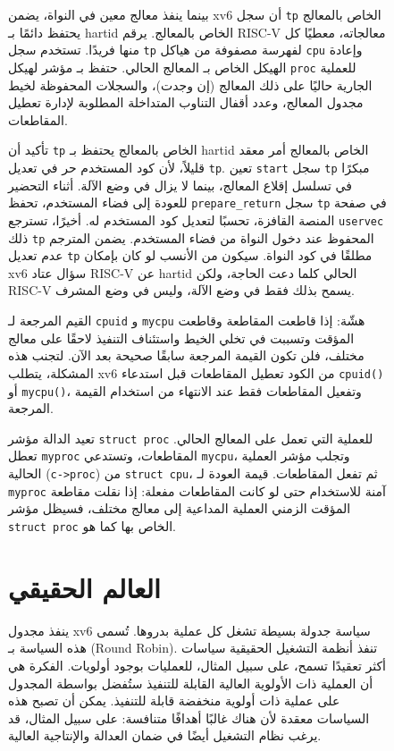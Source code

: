 \begin{figure}[t]
بينما ينفذ معالج معين في النواة، يضمن xv6 أن سجل \lstinline{tp} الخاص بالمعالج يحتفظ دائمًا بـ hartid الخاص بالمعالج.
يرقم RISC-V معالجاته، معطيًا كل منها  فريدًا.
تستخدم   سجل \lstinline{tp} لفهرسة مصفوفة من هياكل \lstinline{cpu} وإعادة الهيكل الخاص بـ المعالج الحالي.
حتفظ  بـ مؤشر لهيكل \lstinline{proc} للعملية الجارية حاليًا على ذلك المعالج (إن وجدت)،
والسجلات المحفوظة لخيط مجدول المعالج، وعدد أقفال التناوب المتداخلة المطلوبة لإدارة تعطيل المقاطعات.

تأكيد أن \lstinline{tp} الخاص بالمعالج يحتفظ بـ hartid الخاص بالمعالج أمر معقد قليلاً، لأن كود المستخدم حر في تعديل \lstinline{tp}.
تعين \lstinline{start} سجل \lstinline{tp} مبكرًا في تسلسل إقلاع المعالج، بينما لا يزال في وضع الآلة.
أثناء التحضير للعودة إلى فضاء المستخدم، تحفظ \lstinline{prepare_return} سجل \lstinline{tp} في صفحة المنصة القافزة، تحسبًا لتعديل كود المستخدم له.
أخيرًا، تسترجع \lstinline{uservec} ذلك \lstinline{tp} المحفوظ عند دخول النواة من فضاء المستخدم.
يضمن المترجم عدم تعديل \lstinline{tp} مطلقًا في كود النواة.
سيكون من الأنسب لو كان بإمكان xv6 سؤال عتاد RISC-V عن hartid الحالي كلما دعت الحاجة، ولكن RISC-V يسمح بذلك فقط في وضع الآلة، وليس في وضع المشرف.

القيم المرجعة لـ \lstinline{cpuid} و \lstinline{mycpu} هشّة: إذا قاطعت المقاطعة وقاطعت المؤقت وتسببت في تخلي الخيط واستئناف التنفيذ لاحقًا على معالج مختلف، فلن تكون القيمة المرجعة سابقًا صحيحة بعد الآن.
لتجنب هذه المشكلة، يتطلب xv6 من الكود تعطيل المقاطعات قبل استدعاء {\tt cpuid()} أو {\tt mycpu()}، وتفعيل المقاطعات فقط عند الانتهاء من استخدام القيمة المرجعة.

تعيد الدالة   مؤشر \lstinline{struct proc} للعملية التي تعمل على المعالج الحالي.
تعطل \lstinline{myproc} المقاطعات، وتستدعي \lstinline{mycpu}، وتجلب مؤشر العملية الحالية (\lstinline{c->proc}) من \lstinline{struct cpu}، ثم تفعل المقاطعات.
قيمة العودة لـ \lstinline{myproc} آمنة للاستخدام حتى لو كانت المقاطعات مفعلة:
إذا نقلت مقاطعة المؤقت الزمني العملية المداعية إلى معالج مختلف، فسيظل مؤشر \lstinline{struct proc} الخاص بها كما هو.

\section{العالم الحقيقي}
\label{sec:real_world_sched}

ينفذ مجدول xv6 سياسة جدولة بسيطة تشغل كل عملية بدروها.
تُسمى هذه السياسة بـ  (Round Robin).
تنفذ أنظمة التشغيل الحقيقية سياسات أكثر تعقيدًا تسمح، على سبيل المثال، للعمليات بوجود أولويات.
الفكرة هي أن العملية ذات الأولوية العالية القابلة للتنفيذ ستُفضل بواسطة المجدول على عملية ذات أولوية منخفضة قابلة للتنفيذ.
يمكن أن تصبح هذه السياسات معقدة لأن هناك غالبًا أهدافًا متنافسة: على سبيل المثال، قد يرغب نظام التشغيل أيضًا في ضمان العدالة والإنتاجية العالية.


\end{figure}
